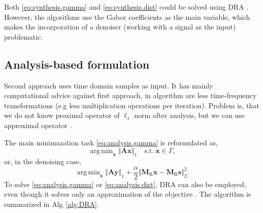 \documentclass[conference]{IEEEtran}
\newcommand{\todo}[1]{\textcolor{red}{#1}}
\begin{document}
%
Both \eqref{eq:synthesis.gamma} and \eqref{eq:synthesis.dist} could be solved using DRA \cite{Mokry2020, Zaviska2021}.
However, the algorithms use the Gabor coefficients as the main variable, which makes the incorporation of a denoiser (working with a signal as the input) problematic.


\subsection{Analysis-based formulation}\label{subsec:timecoef}

Second approach uses time domain samples as input.
It has mainly computational advice against first approach, in algorithm are less time-frequency transformations (e.g less multiplication operations per iteration).
Problem is, 
that we do not know proximal operator of $ \ell_1 $ norm after analysis, but we can use approximal operator \cite{Mokry2021}.

The main minimazation task \eqref{eq:analysis.gamma} is reformulated as,
\begin{equation}
	\label{eq:analysis.gamma}
	\mathop {\operatorname{arg \, min}}_\mathbf {x}\Vert \mathbf{A} \mathbf {x}\Vert _1 \quad \text{s.t.}\ \mathbf {x}\in \Gamma,
\end{equation}
or, in the denoising case,
\begin{equation}
	\label{eq:analysis.dist}
	\mathop {\operatorname{arg \, min}}_\mathbf {x}\Vert \mathbf{A} \mathbf {y}\Vert _1 + \frac{\alpha}{2} \Vert \mathbf{M}_{\mathrm{R}} \mathbf {x} - \mathbf{M}_{\mathrm{R}} \mathbf{s} \Vert^2_2.
\end{equation} 
To solve \eqref{eq:analysis.gamma} or \eqref{eq:analysis.dist}, DRA can also be employed, even though it solves only an approximation of the objective \cite{Mokry2021}.
The algorithm is summarized in Alg.\,\ref{alg:DRA}.
\end{document}

